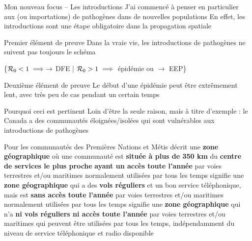 \documentclass[aspectratio=169]{beamer}\usepackage[]{graphicx}\usepackage[]{xcolor}
\begin{document}
\begin{frame}{Mon nouveau focus -- Les introductions}
\bbullet J'ai commencé à penser en particulier aux  (ou importations) de pathogènes dans de nouvelles populations
\vfill
\bbullet En effet, les introductions sont une étape obligatoire dans la propagation spatiale
\end{frame}

\begin{frame}{Premier élément de preuve}
Dans la vraie vie, les introductions de pathogènes ne suivent pas toujours le schéma
\begin{center}
\{$\mathcal{R}_0<1 \implies \to$ DFE | $\mathcal{R}_0>1 \implies $ épidémie ou $\to$ EEP\} 
\end{center}
\end{frame}


\begin{frame}{Deuxième élément de preuve}
Le début d'une épidémie peut être extrêmement lent, avec très peu de cas pendant un certain temps
\end{frame}


\begin{frame}{Pourquoi ceci est pertinent}
Loin d'être la seule raison, mais à titre d'exemple : le Canada a des communautés éloignées/isolées qui sont vulnérables aux introductions de pathogènes
\end{frame}


\begin{frame}{Pour les communautés des Premières Nations et Métis}
   décrit une \textbf{zone géographique} où une communauté est \textbf{située à plus de 350 km} du \textbf{centre de services le plus proche} \textbf{ayant un accès toute l'année} par voies terrestres et/ou maritimes normalement utilisées par tous les temps
  \vfill	
   signifie une \textbf{zone géographique} qui a des \textbf{vols réguliers} et un bon service téléphonique, mais est \textbf{sans accès toute l'année} par voies terrestres et/ou maritimes normalement utilisées par tous les temps
  \vfill
   signifie une \textbf{zone géographique} qui n'a \textbf{ni vols réguliers ni accès toute l'année} par voies terrestres et/ou maritimes qui peuvent être utilisées par tous les temps, indépendamment du niveau de service téléphonique et radio disponible
\end{frame}
\end{document}
